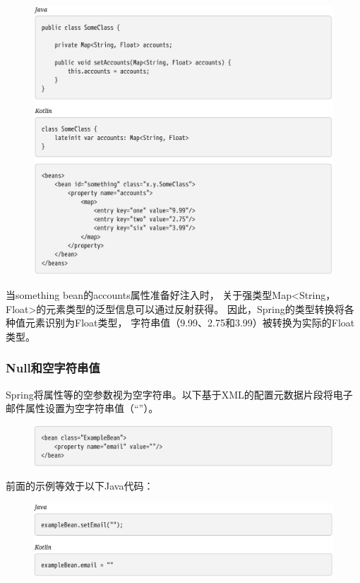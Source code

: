 \newpage
\begin{figure}[ht]
    \centering
    \includegraphics[width=1\linewidth]{./Figure/IMG_code_45.png}
\end{figure}

当something bean的accounts属性准备好注入时，
关于强类型Map<String，Float>的元素类型的泛型信息可以通过反射获得。
因此，Spring的类型转换将各种值元素识别为Float类型，
字符串值（9.99、2.75和3.99）被转换为实际的Float类型。

\subsubsection{Null和空字符串值}
Spring将属性等的空参数视为空字符串。以下基于XML的配置元数据片段将电子邮件属性设置为空字符串值（“”）。

\begin{figure}[ht]
    \centering
    \includegraphics[width=1\linewidth]{./Figure/IMG_code_46.png}
\end{figure}

\newpage
前面的示例等效于以下Java代码：

\begin{figure}[ht]
    \centering
    \includegraphics[width=1\linewidth]{./Figure/IMG_code_47.png}
\end{figure}

